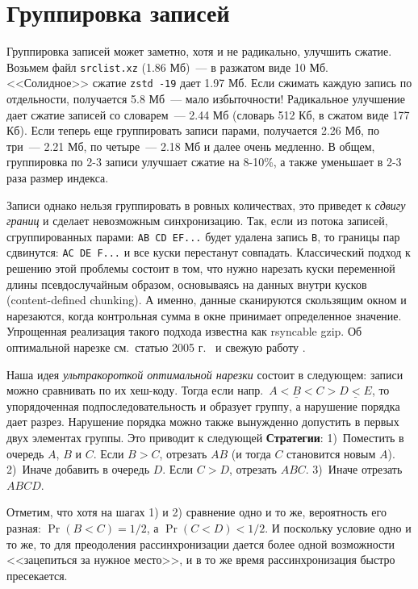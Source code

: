\documentclass[russian,a4paper,12pt]{article}
\begin{document}
\section{Группировка записей}
Группировка записей может заметно, хотя и не радикально, улучшить сжатие.  Возьмем файл \verb|srclist.xz| (1.86 Мб)~--- в разжатом
виде 10 Мб.  <<Солидное>> сжатие \verb|zstd -19| дает 1.97 Мб.  Если сжимать каждую запись по отдельности, получается 5.8 Мб~---
мало избыточности!  Радикальное улучшение дает сжатие записей со словарем~--- 2.44 Мб (словарь 512 Кб, в сжатом виде 177 Кб).
Если теперь еще группировать записи парами, получается 2.26 Мб, по три~--- 2.21 Мб, по четыре~--- 2.18 Мб и далее очень медленно.
В общем, группировка по 2-3 записи улучшает сжатие на 8-10\%, а также уменьшает в 2-3 раза размер индекса.

Записи однако нельзя группировать в ровных количествах, это приведет к \textit{сдвигу границ} и сделает невозможным синхронизацию.
Так, если из потока записей, сгруппированных парами: \texttt{AB CD EF...} будет удалена запись \verb|B|, то границы пар сдвинутся:
\texttt{AC DE F...} и все куски перестанут совпадать.  Классический подход к решению этой проблемы состоит в том, что нужно
нарезать куски переменной длины псевдослучайным образом, основываясь на данных внутри кусков (content-defined chunking).
А именно, данные сканируются скользящим окном и нарезаются, когда контрольная сумма в окне принимает определенное значение.
Упрощенная реализация такого подхода известна как rsyncable gzip.  Об оптимальной нарезке см.~статью 2005 г.~\cite{hp}
и свежую работу \cite{xia}.

Наша идея \textit{ультракороткой оптимальной нарезки} состоит в следующем: записи можно сравнивать по их хеш-коду.
Тогда если напр.~$\underline{A<B<C}>\underline{D<E}$, то упорядоченная подпоследовательность и образует группу,
а нарушение порядка дает разрез.  Нарушение порядка можно также вынужденно допустить в первых двух элементах группы.
Это приводит к следующей \textbf{Стратегии}: 1)~Поместить в очередь $A$, $B$ и $C$.  Если $B>C$, отрезать $AB$ (и тогда $C$
становится новым $A$). 2)~Иначе добавить в очередь $D$.  Если $C>D$, отрезать $ABC$.  3)~Иначе отрезать $ABCD$.

Отметим, что хотя на шагах 1) и 2) сравнение одно и то же, вероятность его разная: $\Pr(B<C)=1/2$, а $\Pr(C<D)<1/2$.
И поскольку условие одно и то же, то для преодоления рассинхронизации дается более одной возможности <<зацепиться
за нужное место>>, и в то же время рассинхронизация быстро пресекается.
\end{document}

